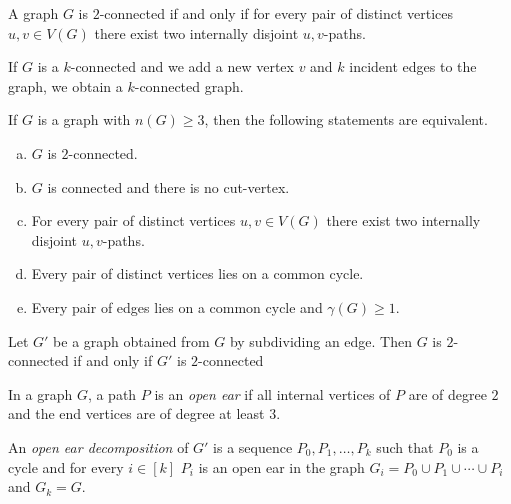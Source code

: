 \begin{theorem}[Whitney]
    A graph $G$ is $2$-connected if and only if for every 
    pair of distinct vertices $u,v \in V(G)$ there 
    exist two internally disjoint $u,v$-paths.
\end{theorem}

\begin{lemma}[Expansion]
    If $G$ is a $k$-connected and we add a new vertex $v$ 
    and $k$ incident edges to the graph, we obtain a 
    $k$-connected graph.
\end{lemma}



\begin{theorem}
    If $G$ is a graph with $n(G) \ge 3$, then the following statements are equivalent.
    \begin{enumerate}[(a)]
        \item $G$ is $2$-connected.
        \item $G$ is connected and there is no cut-vertex.
        \item For every pair of distinct vertices $u,v \in V(G)$ there 
        exist two internally disjoint $u,v$-paths.
        \item Every pair of distinct vertices lies on a common cycle.
        \item Every pair of edges lies on a common cycle and $\gamma(G) \ge 1$.
    \end{enumerate}
\end{theorem}

\begin{lemma}[Subdivision]
    Let $G'$ be a graph obtained from $G$ by subdividing an edge. Then $G$ 
    is $2$-connected if and only if $G'$ is $2$-connected
\end{lemma}

\begin{definition}
    In a graph $G$, a path $P$ is an \emph{open ear} if all internal
    vertices of $P$ are of degree $2$ and the end vertices are of degree at least $3$.
\end{definition}

\begin{definition}
    An \emph{open ear decomposition} of $G'$ is a sequence $P_0, P_1, \dots, P_k$ such 
    that $P_0$ is a cycle and for every $i \in [k]$ $P_i$ is an open ear in 
    the graph $G_i = P_0 \cup P_1 \cup \cdots \cup P_i$ and $G_k = G$.
\end{definition}


